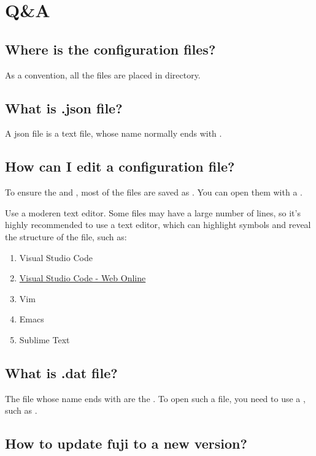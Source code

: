 \chapter{Q\&A}\label{ch:q&a}
\section{Where is the configuration files?}
As a convention, all the files are placed in  directory.


\section{What is .json file?}
A json file is a text file, whose name normally ends with .


\section{How can I edit a configuration file?}
To ensure the  and , most of the files are saved as .
You can open them with a .

\begin{tips}{Use a moderen text editor.}
    Some files may have a large number of lines, so it's highly recommended to use a  text editor, which can highlight symbols and reveal the structure of the file, such as:
    \begin{enumerate}
        \item Visual Studio Code
        \item \href{https://vscode.dev/}{Visual Studio Code - Web Online}
        \item Vim
        \item Emacs
        \item Sublime Text
    \end{enumerate}
\end{tips}


\section{What is .dat file?}
The file whose name ends with  are the .
To open such a file, you need to use a , such as .


\section{How to update fuji to a new version?}

